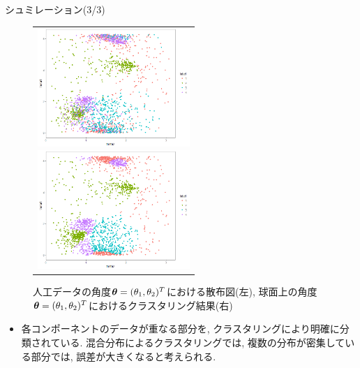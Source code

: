 \documentclass[dvipdfmx]{beamer} %
\newcommand{\bm}[1]{\mbox{\boldmath $#1$}}
\begin{document}
\begin{frame}{シュミレーション(3/3)}

\vspace{-1zh}
\begin{figure}[H]
\begin{tabular}{c}

\begin{minipage}{0.5\hsize}
\begin{center}
\includegraphics[clip,height= 45mm]{data/real.png}
\end{center}
\end{minipage}

\begin{minipage}{0.5\hsize}
\begin{center}
\includegraphics[clip,height= 45mm]{data/pred.png}
\end{center}
\end{minipage}
\end{tabular}
\caption{人工データの角度$\bm \theta = (\theta_1, \theta_2)^T$における散布図(左), 球面上の角度$\bm \theta = (\theta_1, \theta_2)^T$におけるクラスタリング結果(右)}
\end{figure}

\begin{itemize}
\item
各コンポーネントのデータが重なる部分を, クラスタリングにより明確に分類されている. 混合分布によるクラスタリングでは, 複数の分布が密集している部分では, 誤差が大きくなると考えられる.
\end{itemize}

\end{frame}
\end{document}

